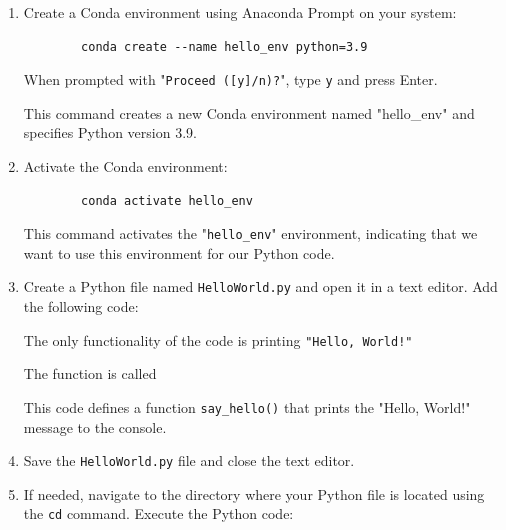 \begin{enumerate}
	\item Create a Conda environment using Anaconda Prompt on your system:
	
	\begin{verbatim}
		conda create --name hello_env python=3.9
	\end{verbatim}
	
	When prompted with "\texttt{Proceed ([y]/n)?}", type \texttt{y} and press Enter.
	
	This command creates a new Conda environment named "hello\_env" and specifies Python version 3.9.
	
	\item Activate the Conda environment:
	
	\begin{verbatim}
		conda activate hello_env
	\end{verbatim}
	
	This command activates the "\texttt{hello\_env}" environment, indicating that we want to use this environment for our Python code.
	
	\item Create a Python file named \texttt{HelloWorld.py} and open it in a text editor. Add the following code:
	
	\begin{code}[h!]
		    
		
		\caption{The only functionality of the code is printing \texttt{"Hello, World!"}}
		\label{code:sayHelloFunc}
	\end{code}
	
	\begin{code}[h!]
		    
		
		\caption{The function  is called}
		\label{code:sayHelloCall}
	\end{code}
	
	This code defines a function \texttt{say\_hello()} that prints the "Hello, World!" message to the console.
	
	\item Save the \texttt{HelloWorld.py} file and close the text editor.
	
	\item If needed, navigate to the directory where your Python file is located using the \texttt{cd} command. Execute the Python code:
	

\end{enumerate}
